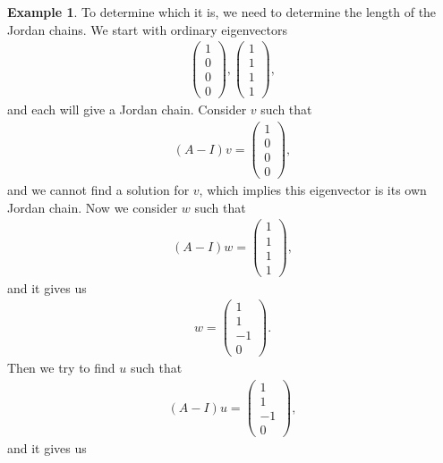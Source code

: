 \documentclass[11pt]{book}
\theoremstyle{definition}
\newtheorem{example}{Example}[chapter]
\numberwithin{equation}{chapter}
\begin{document}
\begin{example}
To determine which it is, we need to determine the length of the Jordan chains. We start with ordinary eigenvectors
\begin{align*}
    \begin{pmatrix}
    1 \\
    0 \\
    0 \\
    0
    \end{pmatrix}, \begin{pmatrix}
    1 \\
    1 \\
    1 \\
    1
    \end{pmatrix},
\end{align*}
and each will give a Jordan chain. Consider $v$ such that
\begin{align*}
    (A - I)v = \begin{pmatrix}
    1 \\
    0 \\
    0 \\
    0
    \end{pmatrix},
\end{align*}
and we cannot find a solution for $v$, which implies this eigenvector is its own Jordan chain. Now we consider $w$ such that
\begin{align*}
    (A - I)w = \begin{pmatrix}
    1 \\
    1 \\
    1 \\
    1
    \end{pmatrix},
\end{align*}
and it gives us 
\begin{align*}
    w = \begin{pmatrix}
    1 \\
    1 \\
    -1 \\
    0
    \end{pmatrix}.
\end{align*}
Then we try to find $u$ such that
\begin{align*}
    (A - I)u = \begin{pmatrix}
    1 \\
    1 \\
    -1 \\
    0
    \end{pmatrix},
\end{align*}
and it gives us
\begin{align*}

\end{align*}
\end{example}
\end{document}
